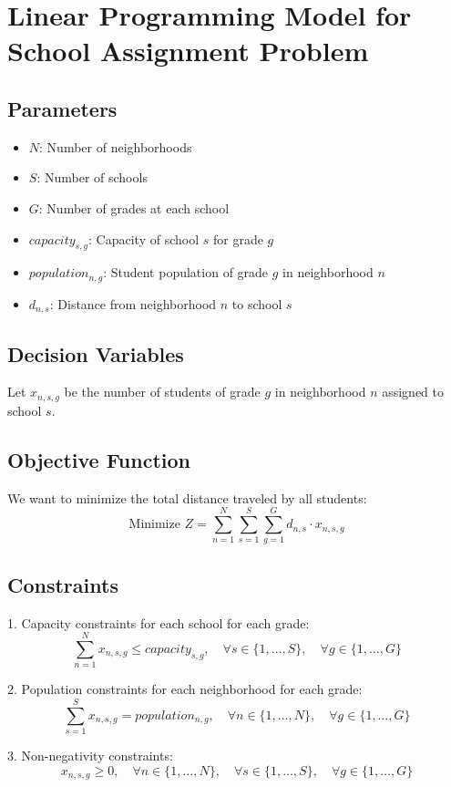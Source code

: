 \documentclass{article}
\begin{document}
\section*{Linear Programming Model for School Assignment Problem}

\subsection*{Parameters}
\begin{itemize}
    \item $N$: Number of neighborhoods
    \item $S$: Number of schools
    \item $G$: Number of grades at each school
    \item $capacity_{s,g}$: Capacity of school $s$ for grade $g$
    \item $population_{n,g}$: Student population of grade $g$ in neighborhood $n$
    \item $d_{n,s}$: Distance from neighborhood $n$ to school $s$
\end{itemize}

\subsection*{Decision Variables}
Let $x_{n,s,g}$ be the number of students of grade $g$ in neighborhood $n$ assigned to school $s$. 

\subsection*{Objective Function}
We want to minimize the total distance traveled by all students:
\[
\text{Minimize } Z = \sum_{n=1}^{N} \sum_{s=1}^{S} \sum_{g=1}^{G} d_{n,s} \cdot x_{n,s,g}
\]

\subsection*{Constraints}
1. Capacity constraints for each school for each grade:
\[
\sum_{n=1}^{N} x_{n,s,g} \leq capacity_{s,g}, \quad \forall s \in \{1, \ldots, S\}, \quad \forall g \in \{1, \ldots, G\}
\]

2. Population constraints for each neighborhood for each grade:
\[
\sum_{s=1}^{S} x_{n,s,g} = population_{n,g}, \quad \forall n \in \{1, \ldots, N\}, \quad \forall g \in \{1, \ldots, G\}
\]

3. Non-negativity constraints:
\[
x_{n,s,g} \geq 0, \quad \forall n \in \{1, \ldots, N\}, \quad \forall s \in \{1, \ldots, S\}, \quad \forall g \in \{1, \ldots, G\}
\]
\end{document}
